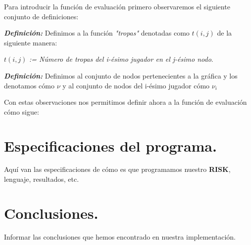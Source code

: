 \documentclass[12pt,twocolumn,draft]{article}
\begin{document}
Para introducir la funci\'on de evaluaci\'on primero observaremos el siguiente conjunto de definiciones:

\textbf{\textit{Definici\'on:}}
Definimos a la funci\'on  \textit{"tropas"} denotadas como 
$t(i,j)$ de la siguiente manera: 
\begin{center}
$t(i,j)$ \textit{:= N\'umero de tropas del i-\'esimo  jugador en el j-\'esimo nodo}.
\end{center}

\textbf{\textit{Definici\'on:}}
Definimos al conjunto de nodos pertenecientes a la gr\'afica y los denotamos c\'omo $\nu$ y al conjunto de nodos del i-\'esimo jugador c\'omo $\nu_{i}$

Con estas observaciones nos permitimos definir ahora a la funci\'on de evaluaci\'on c\'omo sigue:



\section{Especificaciones del programa.}
Aqu\'i van las especificaciones de c\'omo es que programamos nuestro \textbf{RISK}, lenguaje, resultados, etc.

\section{Conclusiones.}
Informar las conclusiones que hemos encontrado en nuestra implementaci\'on. \cite{2personGT}


\newpage
	
{}
\end{document}
